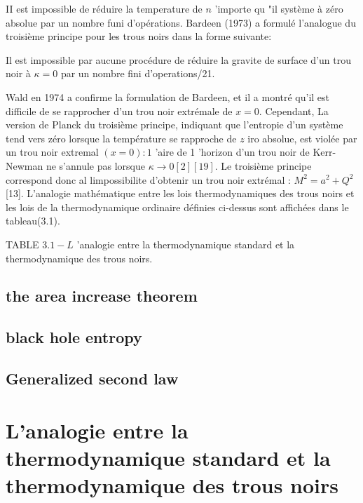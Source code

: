 II est impossible de réduire la temperature de $n$ 'importe qu "il système à zéro absolue par un nombre funi d'opérations.
Bardeen (1973) a formulé l'analogue du troisième principe pour les trous noirs dans la forme suivante:

Il est impossible par aucune procédure de réduire la gravite de surface d'un trou noir à $\kappa=0$ par un nombre fini d'operations/21.

Wald en 1974 a confirme la formulation de Bardeen, et il a montré qu'il est difficile de se rapprocher d'un trou noir extrémale de $x=0 .$ Cependant, La version de Planck du troisième principe, indiquant que l'entropie d'un système tend vers zéro lorsque la température se rapproche de $z$ iro absolue, est violée par un trou noir extremal $(x=0): 1$ 'aire de 1 'horizon d'un trou noir de Kerr-Newman ne s'annule pas lorsque $\kappa \rightarrow 0[2][19] .$ Le troisième principe correspond donc al limpossibilite d'obtenir un trou noir extrémal : $M^{2}=a^{2}+Q^{2}$ [13]. L'analogie mathématique entre les lois thermodynamiques des trous noirs et les lois de la thermodynamique ordinaire définies ci-dessus sont affichées dans le tableau(3.1).

TABLE $3.1-L$ 'analogie entre la thermodynamique standard et la thermodynamique des trous noirs.

 \subsection{ the area increase theorem }

 \subsection{ black hole entropy}



 \subsection{ Generalized second law}





\section{L’analogie entre la thermodynamique standard et la thermodynamique des trous noirs }


